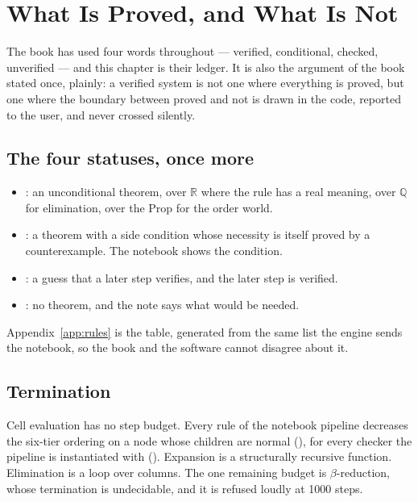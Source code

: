 \chapter{What Is Proved, and What Is Not}\label{ch:ledger}

The book has used four words throughout --- verified, conditional, checked, unverified --- and this
chapter is their ledger. It is also the argument of the book stated once, plainly: a verified
system is not one where everything is proved, but one where the boundary between proved and not is
drawn in the code, reported to the user, and never crossed silently.

\section{The four statuses, once more}

\begin{itemize}[nosep]
  \item {}: an unconditional theorem, over $\mathbb{R}$ where the rule has a real
    meaning, over $\mathbb{Q}$ for elimination, over the Prop for the order world.
  \item {}: a theorem with a side condition whose necessity is itself proved by
    a counterexample. The notebook shows the condition.
  \item {}: a guess that a later step verifies, and the later step is verified.
  \item {}: no theorem, and the note says what would be needed.
\end{itemize}

Appendix~\ref{app:rules} is the table, generated from the same list the engine sends the notebook,
so the book and the software cannot disagree about it.

\section{Termination}

Cell evaluation has no step budget. Every rule of the notebook pipeline decreases the six-tier
ordering on a node whose children are normal (), for every checker the
pipeline is instantiated with (). Expansion is a structurally recursive
function. Elimination is a loop over columns. The one remaining budget is $\beta$-reduction, whose
termination is undecidable, and it is refused loudly at 1000 steps.

